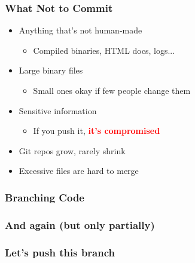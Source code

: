 \documentclass[glossy]{beamer}
\begin{document}
\begin{frame}[fragile=singleslide]
  \frametitle{What Not to Commit}

  \begin{itemize}
    \item Anything that's not human-made
    \begin{itemize}
      \item Compiled binaries, HTML docs, logs...
    \end{itemize}
    \item Large binary files
    \begin{itemize}
      \item Small ones okay if few people change them 
    \end{itemize}
    \item Sensitive information
    \begin{itemize}
      \item If you push it, \textcolor{red}{\textbf{it's compromised}}
    \end{itemize}

    \item Git repos grow, rarely shrink
    \item Excessive files are hard to merge
  \end{itemize}
\end{frame}

\begin{frame}[fragile=singleslide]
  \frametitle{Branching Code}


  \begin{figure}[b]
    \centering
    
  \end{figure}
\end{frame}

\begin{frame}[fragile=singleslide]
  \frametitle{And again (but only partially)}

\end{frame}

\begin{frame}[fragile=singleslide]
  \frametitle{Let's push this branch}

\end{frame}
\end{document}
